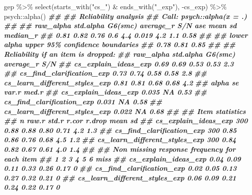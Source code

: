 \documentclass[
]{book}
\newenvironment{Shaded}{\begin{snugshade}}{\end{snugshade}}
\newcommand{\DocumentationTok}[1]{\textcolor[rgb]{0.56,0.35,0.01}{\textbf{\textit{#1}}}}
\newcommand{\FunctionTok}[1]{\textcolor[rgb]{0.00,0.00,0.00}{#1}}
\newcommand{\NormalTok}[1]{#1}
\newcommand{\SpecialCharTok}[1]{\textcolor[rgb]{0.00,0.00,0.00}{#1}}
\newcommand{\StringTok}[1]{\textcolor[rgb]{0.31,0.60,0.02}{#1}}
\begin{document}
\begin{Shaded}
\begin{Highlighting}[]
\NormalTok{gep }\SpecialCharTok{\%\textgreater{}\%} 
  \FunctionTok{select}\NormalTok{(}\FunctionTok{starts\_with}\NormalTok{(}\StringTok{"cs\_"}\NormalTok{) }\SpecialCharTok{\&} \FunctionTok{ends\_with}\NormalTok{(}\StringTok{"\_exp"}\NormalTok{), }\SpecialCharTok{{-}}\NormalTok{cs\_exp) }\SpecialCharTok{\%\textgreater{}\%}
\NormalTok{  psych}\SpecialCharTok{::}\FunctionTok{alpha}\NormalTok{()}
\DocumentationTok{\#\# }
\DocumentationTok{\#\# Reliability analysis   }
\DocumentationTok{\#\# Call: psych::alpha(x = .)}
\DocumentationTok{\#\# }
\DocumentationTok{\#\#   raw\_alpha std.alpha G6(smc) average\_r S/N   ase mean  sd median\_r}
\DocumentationTok{\#\#       0.81      0.82    0.76       0.6 4.4 0.019  4.2 1.1     0.58}
\DocumentationTok{\#\# }
\DocumentationTok{\#\#  lower alpha upper     95\% confidence boundaries}
\DocumentationTok{\#\# 0.78 0.81 0.85 }
\DocumentationTok{\#\# }
\DocumentationTok{\#\#  Reliability if an item is dropped:}
\DocumentationTok{\#\#                               raw\_alpha std.alpha G6(smc) average\_r S/N}
\DocumentationTok{\#\# cs\_explain\_ideas\_exp               0.69      0.69    0.53      0.53 2.3}
\DocumentationTok{\#\# cs\_find\_clarification\_exp          0.73      0.74    0.58      0.58 2.8}
\DocumentationTok{\#\# cs\_learn\_different\_styles\_exp      0.81      0.81    0.68      0.68 4.2}
\DocumentationTok{\#\#                               alpha se var.r med.r}
\DocumentationTok{\#\# cs\_explain\_ideas\_exp             0.035    NA  0.53}
\DocumentationTok{\#\# cs\_find\_clarification\_exp        0.031    NA  0.58}
\DocumentationTok{\#\# cs\_learn\_different\_styles\_exp    0.022    NA  0.68}
\DocumentationTok{\#\# }
\DocumentationTok{\#\#  Item statistics }
\DocumentationTok{\#\#                                 n raw.r std.r r.cor r.drop mean  sd}
\DocumentationTok{\#\# cs\_explain\_ideas\_exp          300  0.88  0.88  0.80   0.71  4.2 1.3}
\DocumentationTok{\#\# cs\_find\_clarification\_exp     300  0.85  0.86  0.76   0.68  4.5 1.2}
\DocumentationTok{\#\# cs\_learn\_different\_styles\_exp 300  0.84  0.82  0.67   0.61  4.0 1.4}
\DocumentationTok{\#\# }
\DocumentationTok{\#\# Non missing response frequency for each item}
\DocumentationTok{\#\#                                  1    2    3    4    5    6 miss}
\DocumentationTok{\#\# cs\_explain\_ideas\_exp          0.04 0.09 0.11 0.33 0.26 0.17    0}
\DocumentationTok{\#\# cs\_find\_clarification\_exp     0.02 0.05 0.13 0.27 0.32 0.21    0}
\DocumentationTok{\#\# cs\_learn\_different\_styles\_exp 0.06 0.09 0.21 0.24 0.22 0.17    0}
\end{Highlighting}
\end{Shaded}
\end{document}

